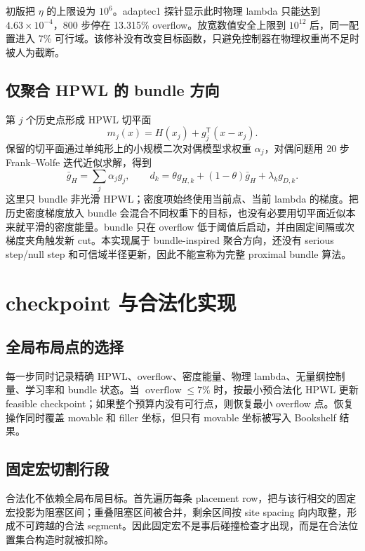 \documentclass[UTF8,a4paper,11pt]{ctexart}
\newcommand{\OVF}{\operatorname{overflow}}
\begin{document}
初版把 \(\eta\) 的上限设为 \(10^6\)。adaptec1 探针显示此时物理 lambda 只能达到 \(4.63\times10^{-4}\)，800 步停在 13.315\% overflow。放宽数值安全上限到 \(10^{12}\) 后，同一配置进入 7\% 可行域。该修补没有改变目标函数，只避免控制器在物理权重尚不足时被人为截断。

\subsection{仅聚合 HPWL 的 bundle 方向}

第 \(j\) 个历史点形成 HPWL 切平面
\begin{equation}
  m_j(x)=H(x_j)+g_j^{\mathsf T}(x-x_j).
\end{equation}
保留的切平面通过单纯形上的小规模二次对偶模型求权重 \(\alpha_j\)，对偶问题用 20 步 Frank--Wolfe 迭代近似求解，得到
\begin{equation}
  \bar g_H=\sum_j\alpha_jg_j,
  \qquad
  d_k=\theta g_{H,k}+(1-\theta)\bar g_H+\lambda_k g_{D,k}.
\end{equation}
这里只 bundle 非光滑 HPWL；密度项始终使用当前点、当前 lambda 的梯度。把历史密度梯度放入 bundle 会混合不同权重下的目标，也没有必要用切平面近似本来就平滑的密度能量。bundle 只在 overflow 低于阈值后启动，并由固定间隔或次梯度夹角触发新 cut。本实现属于 bundle-inspired 聚合方向，还没有 serious step/null step 和可信域半径更新，因此不能宣称为完整 proximal bundle 算法。

\section{checkpoint 与合法化实现}

\subsection{全局布局点的选择}

每一步同时记录精确 HPWL、overflow、密度能量、物理 lambda、无量纲控制量、学习率和 bundle 状态。当 \(\OVF\leq 7\%\) 时，按最小预合法化 HPWL 更新 feasible checkpoint；如果整个预算内没有可行点，则恢复最小 overflow 点。恢复操作同时覆盖 movable 和 filler 坐标，但只有 movable 坐标被写入 Bookshelf 结果。

\subsection{固定宏切割行段}

合法化不依赖全局布局目标。首先遍历每条 placement row，把与该行相交的固定宏投影为阻塞区间；重叠阻塞区间被合并，剩余区间按 site spacing 向内取整，形成不可跨越的合法 segment。因此固定宏不是事后碰撞检查才出现，而是在合法位置集合构造时就被扣除。
\end{document}
